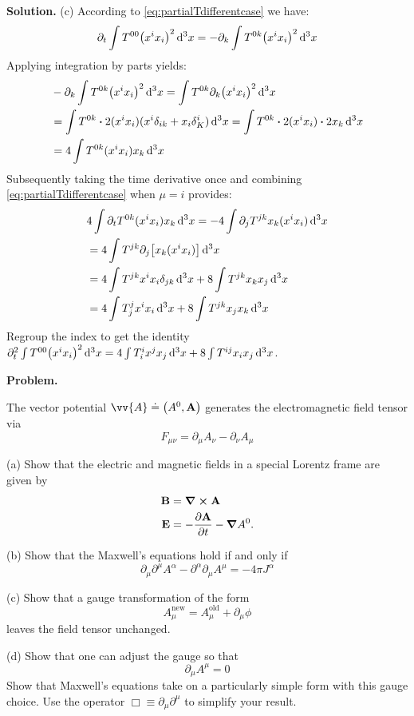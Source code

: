 \documentclass[12pt, a4paper, oneside]{article}
\newcounter{problemname}
\newenvironment{problem}{\begin{shaded}\stepcounter{problemname}\par\noindent\textbf{Problem\arabic{problemname}. }}{\end{shaded}\par}
\newenvironment{solution}{\par\noindent\textbf{Solution. }}{\par}
\renewcommand{\vb}[1]{\ensuremath{\mathbf{#1}}}
\newcommand{\p}{\partial}
\begin{document}
\begin{solution}
    (c) According to \cref{eq:partialTdifferentcase} we have:
    \begin{equation*}
        \p_t \int T^{00}\qty(x^i x_i)^2 \dd[3]{x}=-\p_k \int T^{0k}\qty(x^i x_i)^2\dd[3]{x}
    \end{equation*}
    Applying integration by parts yields:
    \begin{equation*}
        \begin{split}
            &-\p_k \int T^{0k}\qty(x^i x_i)^2\dd[3]{x}=\int T^{0k}\p_k\qty(x^i x_i)^2\dd[3]{x}\\
            &=\int T^{0k}\vdot 2(x^i x_i) (x^i\delta_{ik}+x_i\delta^i_K)\dd[3]{x}=\int T^{0k}\vdot 2(x^i x_i) \vdot 2x_k \dd[3]{x}\\
            &=4\int T^{0k}(x^i x_i)x_k\dd[3]{x}
        \end{split}
    \end{equation*}
    Subsequently taking the time derivative once and combining \cref{eq:partialTdifferentcase} when $\mu=i$ provides:
    \begin{equation*}
        \begin{split}
            &4\int \p_t T^{0k}(x^i x_i)x_k\dd[3]{x}=-4\int \p_j T^{jk}x_k(x^i x_i)\dd[3]{x}\\
            &=4\int T^{jk}\p_j\qty[x_k(x^i x_i)]\dd[3]{x}\\
            &=4\int T^{jk}x^i x_i\delta_{jk}\dd[3]{x}+8\int T^{jk}x_k x_j\dd[3]{x}\\
            &=4\int T^j_j x^i x_i\dd[3]{x}+8\int T^{jk}x_j x_k\dd[3]{x}
        \end{split}
    \end{equation*}
    Regroup the index to get the identity $\p^2_t\int T^{00}\qty(x^i x_i)^2\dd[3]{x}=4\int T^i_i x^j x_j\dd[3]{x}+8\int T^{ij}x_i x_j\dd[3]{x}$.
\end{solution}

\begin{problem}

    The vector potential $\vv{A} \doteq \qty(A^0, \vb{A})$ generates the electromagnetic field tensor via
    \[
    F_{\mu\nu}=\p_\mu A_\nu - \p_\nu A_\mu
    \]

    (a) Show that the electric and magnetic fields in a special Lorentz frame are given by
    \begin{align*}
        \vb{B} & = \curl{\vb{A}}\\
        \vb{E} & = -\pdv{\vb{A}}{t}-\grad{A^0}.
    \end{align*}

    (b) Show that the Maxwell's equations hold if and only if
    \[
    \p_\mu \p^\mu A^\alpha - \p^\alpha \p_\mu A^\mu = -4\pi J^\alpha
    \]

    (c) Show that a gauge transformation of the form
    \[
    A^{\text{new}}_\mu = A^{\text{old}}_\mu + \p_\mu \phi
    \]
    leaves the field tensor unchanged.

    (d) Show that one can adjust the gauge so that
    \[
    \p_\mu A^\mu = 0
    \]
    Show that Maxwell's equations take on a particularly simple form with this gauge choice. Use the operator $\Box \equiv \p_\mu \p^\mu$ to simplify your result.
\end{problem}
\end{document}
